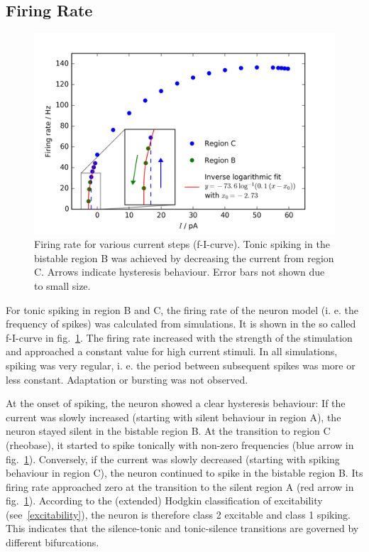 \documentclass[12pt,a4paper,]{report}
\begin{document}
\subsection{Firing Rate}\label{firing-rate}

\begin{figure}
\centering
\includegraphics[]{images/f-I-curve.png}
\caption[Firing rate for various current steps (f-I-curve)]{Firing rate for various current steps (f-I-curve). Tonic
spiking in the bistable region B was achieved by decreasing the current
from region C. Arrows indicate hysteresis behaviour. Error bars not
shown due to small size.}\label{f-i-curve}
\end{figure}

For tonic spiking in region B and C, the firing rate of the neuron model
(i. e. the frequency of spikes) was calculated from simulations. It is
shown in the so called f-I-curve in fig.~\ref{f-i-curve}. The firing
rate increased with the strength of the stimulation and approached a
constant value for high current stimuli. In all simulations, spiking was
very regular, i. e. the period between subsequent spikes was more or
less constant. Adaptation or bursting was not observed.

At the onset of spiking, the neuron showed a clear hysteresis behaviour:
If the current was slowly increased (starting with silent behaviour in
region A), the neuron stayed silent in the bistable region B. At the
transition to region C (rheobase), it started to spike tonically with
non-zero frequencies (blue arrow in fig.~\ref{f-i-curve}). Conversely,
if the current was slowly decreased (starting with spiking behaviour in
region C), the neuron continued to spike in the bistable region B. Its
firing rate approached zero at the transition to the silent region A
(red arrow in fig.~\ref{f-i-curve}). According to the (extended) Hodgkin
classification of excitability (see~\ref{excitability}), the neuron is
therefore class 2 excitable and class 1 spiking. This indicates that the
silence-tonic and tonic-silence transitions are governed by different
bifurcations.
\end{document}

